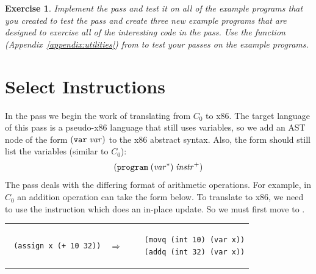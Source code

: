 \documentclass[11pt]{book}
\newtheorem{exercise}[theorem]{Exercise}
\begin{document}
\begin{exercise}
\normalfont
Implement the  pass and test it on all of the example
programs that you created to test the  pass and create
three new example programs that are designed to exercise all of the
interesting code in the  pass. Use the 
function (Appendix~\ref{appendix:utilities}) from  to
test your passes on the example programs.
\end{exercise}


\section{Select Instructions}
\label{sec:select-s0}

In the  pass we begin the work of translating
from $C_0$ to x86. The target language of this pass is a pseudo-x86
language that still uses variables, so we add an AST node of the form
$(\texttt{var}\;\mathit{var})$ to the x86 abstract syntax. Also, the 
form should still list the variables (similar to $C_0$):
\[
  (\texttt{program}\;(\mathit{var}^{*})\;\mathit{instr}^{+})
\]
The  pass deals with the differing format of
arithmetic operations. For example, in $C_0$ an addition operation can
take the form below.  To translate to x86, we need to use the
 instruction which does an in-place update. So we must first
move  to . \\
\begin{tabular}{lll}
\begin{minipage}{0.4\textwidth}
\begin{lstlisting}
 (assign x (+ 10 32))
\end{lstlisting}
\end{minipage}
&
$\Rightarrow$
&
\begin{minipage}{0.4\textwidth}
\begin{lstlisting}
   (movq (int 10) (var x))
   (addq (int 32) (var x))
\end{lstlisting}
\end{minipage}
\end{tabular} \\
\end{document}
